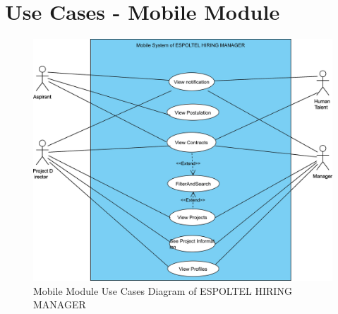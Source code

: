 \documentclass{scrreprt}
\begin{document}
\section{Use Cases - Mobile Module}
\begin{figure}[H]
	\centering  \small
	\includegraphics[width=\textwidth]{UseCases/MobileUseCases.jpg} 
	\caption{Mobile Module Use Cases Diagram of ESPOLTEL HIRING MANAGER}
	\label{fig:MobileUseCases}
\end{figure}
\end{document}

